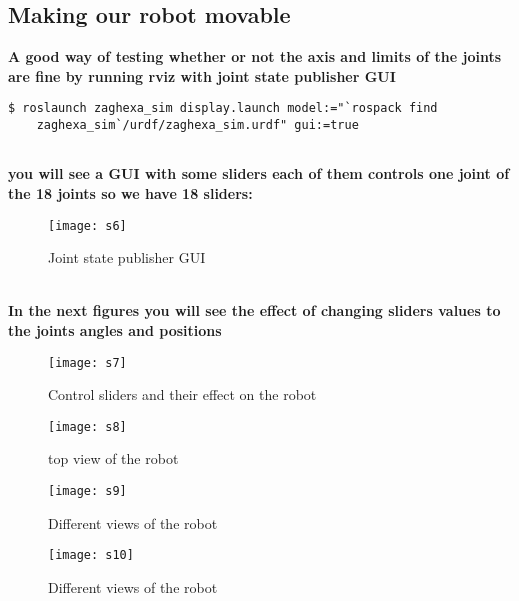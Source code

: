 \documentclass[a4paper]{article}
\begin{document}
\subsection{Making our robot movable}
\textbf{A good way of testing whether or not the axis and limits of the joints are fine by running rviz with joint state publisher GUI}
\begin{lstlisting}
$ roslaunch zaghexa_sim display.launch model:="`rospack find
	zaghexa_sim`/urdf/zaghexa_sim.urdf" gui:=true
		
\end{lstlisting}
\textbf{you will see a GUI with some sliders each of them controls one joint of the 18 joints so we have 18 sliders:}
\begin{figure}[h]
	\centering
	\texttt{[image: s6]}
	\caption{Joint state publisher GUI}
	\label{fig:s6}
\end{figure}
\\\textbf{In the next figures you will see the effect of changing sliders values to the joints angles and positions}
\begin{figure}[h]
	\centering
	\texttt{[image: s7]}
	\caption{Control sliders and their effect on the robot }
	\label{fig:s7}
\end{figure}
\begin{figure}[htb]
	\centering
	\texttt{[image: s8]}
	\caption{top view of the robot}
	\label{fig:s8}
	\texttt{[image: s9]}
	\caption{Different views of the robot}
	\label{fig:s9}
	\texttt{[image: s10]}
	\caption{Different views of the robot}
	\label{fig:s10}
\end{figure}
\end{document}
